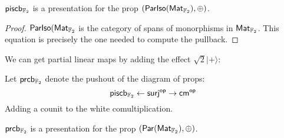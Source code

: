 \begin{lemma}
\label{lem:parisocb}
${\sf pis}{\sf cb}_{\mathbb{F}_2}$ is a presentation for the prop $(\mathsf{Par}{\sf Iso}(\mathsf{Mat}_{\mathbb{F}_2}),\oplus)$.
\end{lemma}
\begin{proof}
$\mathsf{Par}{\sf Iso}(\mathsf{Mat}_{\mathbb{F}_2}$ is the category of spans of monorphisms in $\mathsf{Mat}_{\mathbb{F}_2}$.  This equation is precisely the one needed to compute the pullback.
\end{proof}




We can get partial linear maps by adding the effect $\sqrt{2}|+\rangle$:

\begin{definition}

Let ${\sf pr}{\sf cb}_{\mathbb{F}_2}$ denote the pushout of the diagram of props:
$$
{\sf pis}{\sf cb}_{\mathbb{F}_2}  \leftarrow  {\sf surj}^{\mathsf{op}} \rightarrow   {\sf cm}^{\mathsf{op}}
$$
Adding a counit to the white comultiplication.
\end{definition}




\begin{lemma}
\label{lem:parcb}

${\sf pr}{\sf cb}_{\mathbb{F}_2}$ is a presentation for the prop $(\mathsf{Par}(\mathsf{Mat}_{\mathbb{F}_2}),\oplus)$.
\end{lemma}



